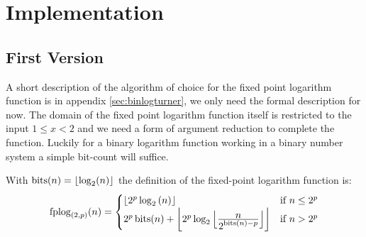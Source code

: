 \section{Implementation}
\subsection{First Version}
\begin{center}
  \begin{algorithmic}[1]
       \label{alg:line:approxdiv}
       \EndIf
        
       \EndIf
       \label{alg:line:cormul}
          \Do
          \Else
          \EndIf
       \EndIf
       \label{alg:line:cordiv}
          \Do
              
       \EndIf
    \EndFunction
  \end{algorithmic}
\end{center}
A short description of the algorithm of choice for the fixed point logarithm function is in
appendix \ref{sec:binlogturner}, we only need the formal description for now. The domain of
the fixed point logarithm function itself is restricted to the input $1 \le x < 2$ and we
need a form of argument reduction to complete the function. Luckily for a binary logarithm
function working in a binary number system a simple bit-count will suffice.
\begin{defn}\label{def:fplog2}
With $\operatorname{bits}(n) = \left\lfloor\log_2(n)\right\rfloor$ the definition of the fixed-point logarithm function is:
\begin{equation} \label{eq:fixedpointbinlog}
\operatorname{fplog}_{(2,p)}(n) = \begin{cases} \left\lfloor2^p\log_2\left(n\right)\right\rfloor&\textrm{if } n\le 2^p\\
 2^p\operatorname{bits}(n) + \biggl\lfloor2^p\log_2\left\lfloor\frac{\displaystyle n}{\displaystyle 2^{\operatorname{bits}(n) - p}}\right\rfloor\biggr\rfloor & \textrm{if } n > 2^p
\end{cases}
\end{equation}
\end{defn}
